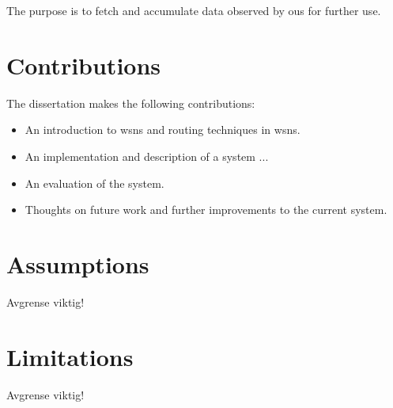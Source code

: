 \documentclass[USenglish]{uit-thesis}
\begin{document}


The purpose is to fetch and accumulate data observed by \gls{ou}s  for further use.



\section{Contributions}
The dissertation makes the following contributions:
\begin{itemize}
\item An introduction to \gls{wsn}s and routing techniques in \gls{wsn}s.
\item An implementation and description of a system ...
\item An evaluation of the system.
\item Thoughts on future work and further improvements to the current system.
\end{itemize}

\section{Assumptions}
Avgrense viktig!

\section{Limitations}
Avgrense viktig!
\end{document}

